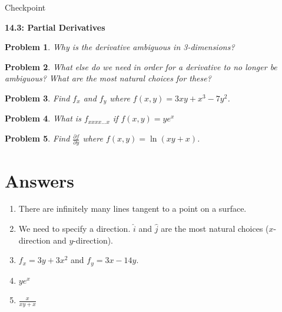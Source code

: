 \documentclass[11pt]{article}
\newtheorem{problem}{Problem}
\newcommand{\vs}{\vspace*{.1in}}
\begin{document}
\begin{huge}
    \begin{center}
        Checkpoint
    \end{center}
\end{huge}
\begin{large}\begin{center}\bf 14.3: Partial Derivatives \end{center}
\end{large}

\vs\vs

\begin{problem}
Why is the \emph{derivative} ambiguous in 3-dimensions?
\end{problem}

\begin{problem}
What else do we need in order for a derivative to no longer be ambiguous? What are the most natural choices for these?
\end{problem}

\begin{problem}
Find $f_x$ and $f_y$ where $f(x,y) = 3xy+x^3-7y^2$.
\end{problem}


\begin{problem}
What is $f_{xxxx...x}$ if $f(x,y) = ye^{x}$
\end{problem}

\begin{problem}
Find $\frac{\partial f}{\partial y}$ where $f(x,y) = \ln(xy+x)$.
\end{problem}


\newpage

\section{Answers}

\begin{enumerate}
    \item There are infinitely many lines tangent to a point on a surface.
    \item We need to specify a direction. $\hat{i}$ and $\hat{j}$ are the most natural choices ($x$-direction and $y$-direction).
    \item $f_x = 3y+3x^2$ and $f_y = 3x - 14y$.
    \item $ye^x$
    \item $\frac{x}{xy+x}$
\end{enumerate}
\end{document}
